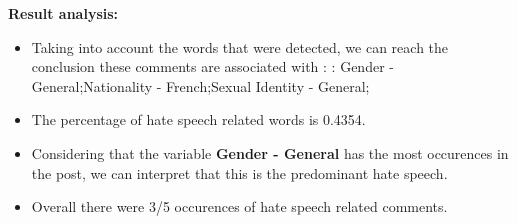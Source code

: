 \documentclass[11pt]{article}
\begin{document}
\textbf{\Large Result analysis:}

\begin{itemize}\item Taking into account the words that were detected, we can reach the conclusion these comments are associated with : : Gender - General;Nationality - French;Sexual Identity - General;%

\item The percentage of hate speech related words is 0.4354.

\item Considering that the variable \textbf{Gender - General} has the most occurences in the post, we can interpret that this is the predominant hate speech.

\item Overall there were 3/5 occurences of hate speech related comments.\end{itemize}
\end{document}

